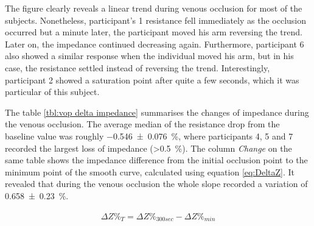 The figure clearly reveals a linear trend during venous occlusion for most of the subjects. Nonetheless, participant's 1 resistance fell immediately as the occlusion occurred but a minute later, the participant moved his arm reversing the trend. Later on, the impedance continued decreasing again. Furthermore,  participant 6 also showed a similar response when the individual moved his arm, but in his case, the resistance settled instead of reversing the trend. Interestingly, participant 2 showed a saturation point after quite a few seconds, which it was particular of this subject. 

The table \ref{tbl:vop delta impedance} summarises the changes of impedance during the venous occlusion. The average median of the resistance drop from the baseline value was roughly \SI{-0.546(0076)}{\%}, where participants 4, 5 and 7 recorded the largest loss of impedance (>\SI{0.5}{\%}). The column \textit{Change} on the same table shows the impedance difference from the initial occlusion point to the minimum point of the smooth curve, calculated using equation \ref{eq:DeltaZ}. It revealed that during the venous occlusion the whole slope recorded a variation of \SI{0.658(0230)}{\percent}.

\begin{align}
	\label{eq:DeltaZ}
	\Delta Z\%_T = \Delta Z\%_{300 sec} - \Delta Z\%_{min}
\end{align}


